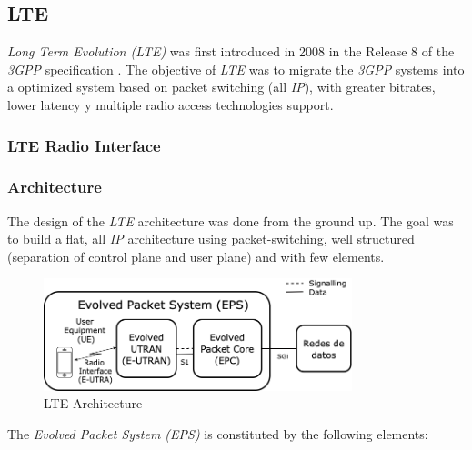 \subsection{LTE}
\label{sec:4g}

\textit{Long Term Evolution (LTE)} was first introduced in 2008 in the Release 8 of the \textit{3GPP}
specification \cite{lte1}. The objective of \textit{LTE} was to migrate the \textit{3GPP} systems
into a optimized system based on packet switching (all \textit{IP}), with greater bitrates, lower
latency y multiple radio access technologies support.

\subsubsection{LTE Radio Interface}

\subsubsection{Architecture}
\label{sec:eps}

The design of the \textit{LTE} architecture was done from the ground up. The goal was to build a flat, all
\textit{IP} architecture using packet-switching, well structured (separation of control plane and user plane)
and with few elements.

\begin{figure}[h]
  \centering
  \includegraphics[width=0.8\textwidth]{img/eps.png}
  \caption{LTE Architecture}
  \label{fig:eps}
\end{figure}

The \textit{Evolved Packet System (EPS)} is constituted by the following elements:

